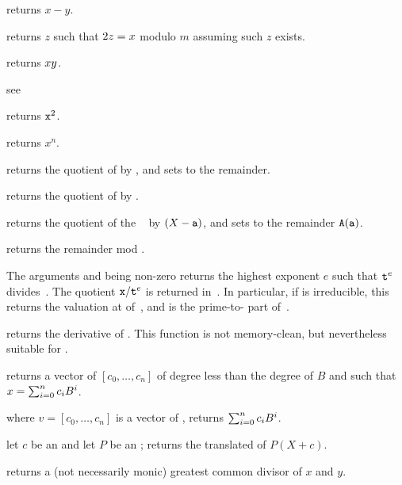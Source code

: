  returns $x-y$.

 returns $z$ such that $2\*z = x$ modulo
$m$ assuming such $z$ exists.

 returns $x\*y$.

see 

 returns ${\tt x}^2$.

 returns $x^n$.

 returns the quotient
of  by , and sets  to the remainder.

 returns the quotient of  by
.

 returns the
quotient of the ~ by $(X - {\tt a})$, and sets  to the
remainder ${\tt A}({\tt a})$.

 returns the remainder  mod
.

 The arguments  and
 being non-zero  returns the highest exponent $e$ such that
${\tt t}^{e}$ divides~. The quotient ${\tt x}/{\tt t}^{e}$ is returned
in~. In particular, if  is irreducible, this returns the
valuation at  of~, and  is the prime-to- part
of~.

 returns the derivative of .
This function is not memory-clean, but nevertheless suitable for
.

 returns a vector of 
$[c_0,\ldots,c_n]$ of degree less than the degree of $B$ and such that
$x=\sum_{i=0}^{n}{c_i\*B^i}$.

 where $v=[c_0,\ldots,c_n]$
is a vector of , returns $\sum_{i=0}^{n}{c_i\*B^i}$.

 let $c$ be an  and let
$P$ be an ; returns the translated  of $P(X+c)$.

 returns a (not necessarily monic)
greatest common divisor of $x$  and $y$.

